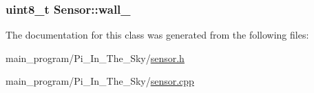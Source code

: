 \subsubsection[{\texorpdfstring{wall\+\_\+}{wall_}}]{\setlength{\rightskip}{0pt plus 5cm}uint8\+\_\+t Sensor\+::wall\+\_\+}\hypertarget{class_sensor_a09506b22991de665b8e85727bfced262}{}\label{class_sensor_a09506b22991de665b8e85727bfced262}


The documentation for this class was generated from the following files\+:\begin{DoxyCompactItemize}
\item 
main\+\_\+program/\+Pi\+\_\+\+In\+\_\+\+The\+\_\+\+Sky/\hyperlink{sensor_8h}{sensor.\+h}\item 
main\+\_\+program/\+Pi\+\_\+\+In\+\_\+\+The\+\_\+\+Sky/\hyperlink{sensor_8cpp}{sensor.\+cpp}\end{DoxyCompactItemize}
